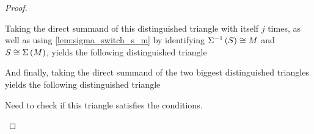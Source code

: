 \begin{proof}
\begin{enumerate}
{\begin{center}
            \end{center}

            Taking the direct summand of this distinguished triangle with itself \( j \) times, as well as using \autoref{lem:sigma_switch_s_m} by identifying \( \Sigma^{-1}\left( S \right) \cong M \) and \( S \cong \Sigma\left( M \right) \), yields the following distinguished triangle
            \begin{center}
            \end{center}

            And finally, taking the direct summand of the two biggest distinguished triangles yields the following distinguished triangle
            \begin{center}
            \end{center}
            Need to check if this triangle satisfies the conditions.

}
\end{enumerate}
\end{proof}
